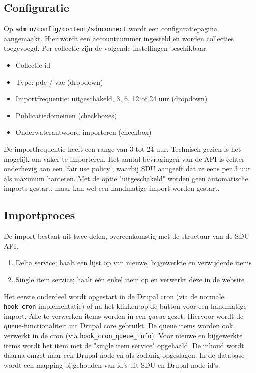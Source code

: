 \documentclass[12pt]{article}
\begin{document}
\subsection{Configuratie}\label{configuratie}

Op \texttt{admin/config/content/sduconnect} wordt een configuratiepagina aangemaakt. Hier wordt een accountnummer ingesteld en worden collecties toegevoegd. Per collectie zijn de volgende instellingen beschikbaar:

\begin{itemize}
\item Collectie id
\item Type: pdc / vac (dropdown)
\item Importfrequentie: uitgeschakeld, 3, 6, 12 of 24 uur (dropdown)
\item Publicatiedomeinen (checkboxes)
\item Onderwaterantwoord importeren (checkbox)
\end{itemize}

De importfrequentie heeft een range van 3 tot 24 uur. Technisch gezien is het mogelijk om vaker te importeren. Het aantal bevragingen van de API is echter onderhevig aan een 'fair use policy', waarbij SDU aangeeft dat ze eens per 3 uur als maximum hanteren. Met de optie "uitgeschakeld" worden geen automatische imports gestart, maar kan wel een handmatige import worden gestart.

\clearpage
\subsection{Importproces}\label{importproces}

De import bestaat uit twee delen, overeenkomstig met de structuur van de SDU API.
\begin{enumerate}
\item Delta service; haalt een lijst op van nieuwe, bijgewerkte en verwijderde items
\item Single item service; haalt \'{e}\'{e}n enkel item op en verwerkt deze in de website
\end{enumerate}

Het eerste onderdeel wordt opgestart in de Drupal cron (via de normale \texttt{hook\_cron}-implementatie) of na het klikken op de button voor een handmatige import. Alle te verwerken items worden in een \emph{queue} gezet. Hiervoor wordt de queue-functionaliteit uit Drupal core gebruikt. De queue items worden ook verwerkt in de cron (via \texttt{hook\_cron\_queue\_info}). Voor nieuwe en bijgewerkte items wordt het item met de "single item service" opgehaald. De inhoud wordt daarna omzet naar een Drupal node en als zodanig opgeslagen. In de database wordt een mapping bijgehouden van id's uit SDU en Drupal node id's.
\end{document}
